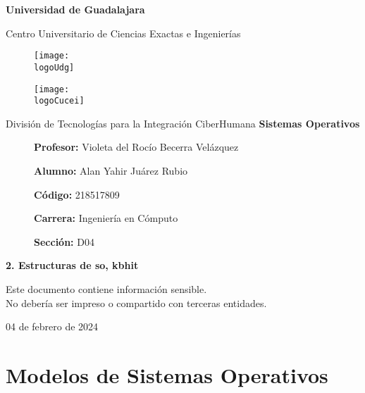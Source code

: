 \documentclass[12pt, a4paper]{article} %
\title{\theTitle}
\author{\theAuthor}
\newcommand{\logoUdg}{../../../../attachments/images/portada-udg.jpeg}
\newcommand{\logoCucei}{../../../../attachments/images/portada-cucei.jpeg}
\newcommand{\materia}{Sistemas Operativos}
\newcommand{\theTitle}{2. Estructuras de so, kbhit}
\newcommand{\profesor}{Violeta del Rocío Becerra Velázquez}
\newcommand{\theAuthor}{Alan Yahir Juárez Rubio}
\newcommand{\code}{218517809}
\newcommand{\carrera}{Ingeniería en Cómputo}
\newcommand{\seccion}{D04}
\newcommand{\startDate}{04 de febrero de 2024}
\newcommand{\nl}{\par\vspace{0.4cm}}
\begin{document}
\cfoot{\ifodd\value{page}\else\thepage\fi} %

\begin{titlepage}
	\centering
	{\huge\textbf{Universidad de Guadalajara}}\par\vspace{0.6cm}
	{\LARGE{Centro Universitario de Ciencias Exactas e Ingenierías}}\vfill
	
	\begin{figure}[h]
		\begin{minipage}[t]{0.45\textwidth}
			\centering
			\texttt{[image: \\logoUdg]}
		\end{minipage}
		\hfill
		\begin{minipage}[t]{0.45\textwidth}
			\centering
			\texttt{[image: \\logoCucei]}
		\end{minipage}
	\end{figure}\vfill
	
	{\Large{División de Tecnologías para la Integración CiberHumana}}\vfill
	{\Large\textbf{\materia}}\vfill
	\begin{figure}[h]
		\centering
		\begin{minipage}[t]{0.75\textwidth}
			{\Large
				\textbf{Profesor:} \profesor\nl
				\textbf{Alumno:} \theAuthor\nl
				\textbf{Código:} \code\nl
				\textbf{Carrera:} \carrera\nl
				\textbf{Sección:} \seccion
			}
		\end{minipage}
	\end{figure}\vfill
	{\LARGE{\textbf{\theTitle}}}\vfill
	
	\begin{tcolorbox}[colback=red!5!white, colframe=red!75!black]
		\centering
		Este documento contiene información sensible.\\
		No debería ser impreso o compartido con terceras entidades.
	\end{tcolorbox}\vfill
	{\large \startDate}\par
\end{titlepage}

\clearpage
\tableofcontents

	

\clearpage
\section{Modelos de Sistemas Operativos}
\end{document}
